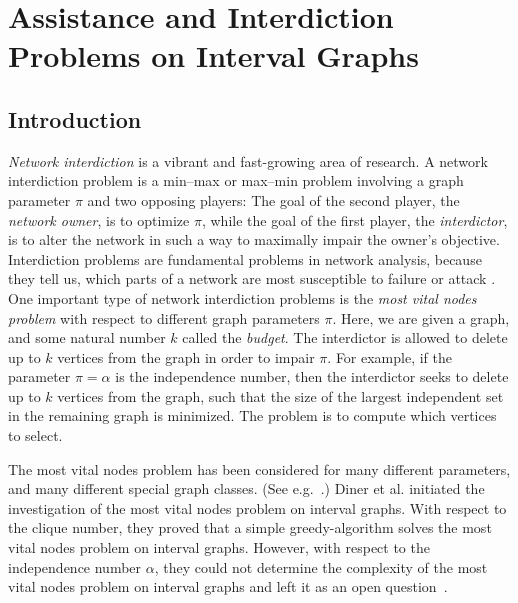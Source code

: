 




\chapter{Assistance and Interdiction Problems on Interval Graphs}


\section{Introduction}


\emph{Network interdiction} \cite{NetworkInterdictProblemsBookChapter} is a vibrant and fast-growing area of research. 
A network interdiction problem is a min–max or max–min problem 
involving a graph parameter $\pi$ and two opposing players: 
The goal of the second player, the \emph{network owner}, is to optimize $\pi$, while the goal of the first player, the \emph{interdictor}, 
is to alter the network in such a way to maximally impair the owner's objective. 
Interdiction problems are fundamental problems in network 
analysis, because they tell us, which parts of a network are most susceptible 
to failure or attack \cite{criticalNodeDetectionSurvey}. 
One important type of network interdiction problems
is the \emph{most vital nodes problem} with respect to different graph parameters $\pi$. 
Here, we are given a graph, and some natural number $k$ called the \emph{budget}. The interdictor is allowed to delete up to $k$ vertices from the graph in order to impair $\pi$. For example, if the parameter $\pi = \alpha$ is the independence number, then the interdictor seeks to delete up to $k$ vertices from the graph, such that the size of the largest independent set in the remaining graph is minimized. The problem is to compute which vertices to select.

The most vital nodes problem has been considered for many different parameters, and many different special graph classes. (See e.g.\ \cite{baier2010length,complexityOfFindingMostVitalNodesShortestPath,mostVitalNodesWrtIndSet,mostVitalLinksNodes1982,mahdavi2014minimum}.) Diner et al. \cite{diner2018contractionDeletionBlockers} initiated the investigation of the most vital nodes problem on interval graphs. 
With respect to the clique number, they proved that a simple greedy-algorithm 
solves the most vital nodes problem on interval graphs. However, with respect to the independence number $\alpha$, they could not determine the complexity of the most vital nodes problem on interval graphs and left it as an open question~\cite[(Q2)]{diner2018contractionDeletionBlockers}.

